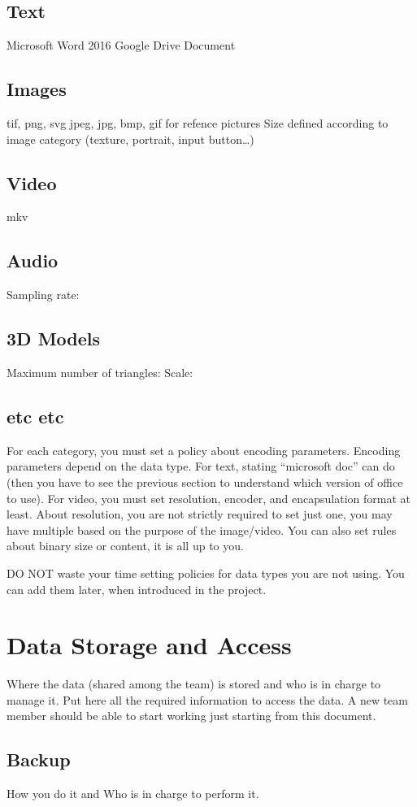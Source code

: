 \documentclass[12pt]{article}
\begin{document}
\subsection{Text}
Microsoft Word 2016
Google Drive Document
\subsection{Images}
tif, png, svg
jpeg, jpg, bmp, gif for refence pictures
Size defined according to image category (texture, portrait, input button…)
\subsection{Video}
mkv
\subsection{Audio}
Sampling rate:
\subsection{3D Models}
Maximum number of triangles: 
Scale: 
\subsection{etc etc}

For each category, you must set a policy about encoding parameters.
Encoding parameters depend on the data type. For text, stating “microsoft doc” can do (then you have to see the previous section to understand which version of office to use). For video, you must set resolution, encoder, and encapsulation format at least. About resolution, you are not strictly required to set just one, you may have multiple based on the purpose of the image/video.
You can also set rules about binary size or content, it is all up to you.

DO NOT waste your time setting policies for data types you are not using. You can add them later, when introduced in the project.
\section{Data Storage and Access}
Where the data (shared among the team) is stored and who is in charge to manage it.
Put here all the required information to access the data. A new team member should be able to start working just starting from this document.
\subsection{Backup}
How you do it and Who is in charge to perform it.
\end{document}
